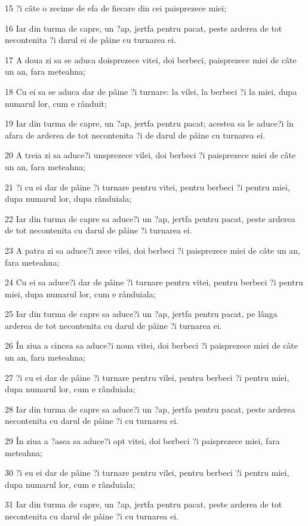 \par 15 ?i câte o zecime de efa de fiecare din cei paisprezece miei;
\par 16 Iar din turma de capre, un ?ap, jertfa pentru pacat, peste arderea de tot necontenita ?i darul ei de pâine cu turnarea ei.
\par 17 A doua zi sa se aduca doisprezece vitei, doi berbeci, paisprezece miei de câte un an, fara meteahna;
\par 18 Cu ei sa se aduca dar de pâine ?i turnare: la vilei, la berbeci ?i la miei, dupa numarul lor, cum e rânduit;
\par 19 Iar din turma de capre, un ?ap, jertfa pentru pacat; acestea sa le aduce?i în afara de arderea de tot necontenita ?i de darul de pâine cu turnarea ei.
\par 20 A treia zi sa aduce?i unsprezece vilei, doi berbeci ?i paisprezece miei de câte un an, fara meteahna;
\par 21 ?i cu ei dar de pâine ?i turnare pentru vitei, pentru berbeci ?i pentru miei, dupa numarul lor, dupa rânduiala;
\par 22 Iar din turma de capre sa aduce?i un ?ap, jertfa pentru pacat, peste arderea de tot necontenita cu darul de pâine ?i turnarea ei.
\par 23 A patra zi sa aduce?i zece vilei, doi berbeci ?i paisprezece miei de câte un an, fara meteahna;
\par 24 Cu ei sa aduce?i dar de pâine ?i turnare pentru vitei, pentru berbeci ?i pentru miei, dupa numarul lor, cum e rânduiala;
\par 25 Iar din turma de capre sa aduce?i un ?ap, jertfa pentru pacat, pe lânga arderea de tot necontenita cu darul de pâine ?i turnarea ei.
\par 26 În ziua a cincea sa aduce?i noua vitei, doi berbeci ?i paisprezece miei de câte un an, fara meteahna;
\par 27 ?i cu ei dar de pâine ?i turnare pentru vilei, pentru berbeci ?i pentru miei, dupa numarul lor, cum e rânduiala;
\par 28 Iar din turma de capre sa aduce?i un ?ap, jertfa pentru pacat, peste arderea necontenita cu darul de pâine ?i cu turnarea ei.
\par 29 În ziua a ?asea sa aduce?i opt vitei, doi berbeci ?i paisprezece miei, fara meteahna;
\par 30 ?i eu ei dar de pâine ?i turnare pentru vilei, pentru berbeci ?i pentru miei, dupa numarul lor, cum e rânduiala;
\par 31 Iar din turma de capre, un ?ap, jertfa pentru pacat, peste arderea de tot necontenita cu darul de pâine ?i cu turnarea ei.
